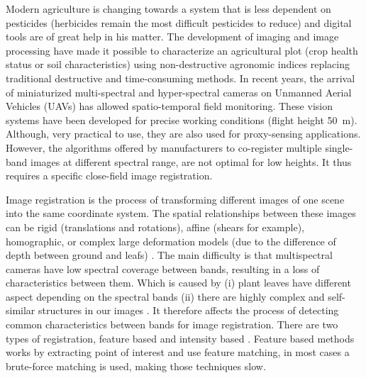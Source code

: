 \documentclass[]{elsarticle}
\begin{document}
	\par Modern agriculture is changing towards a system that is less dependent on pesticides \cite{10.1371/journal.pone.0097922}
	(herbicides remain the most difficult pesticides to reduce) and digital tools are of great help in his matter.
	The development of imaging and image processing have made it possible to characterize an agricultural plot \cite{SANKARAN2015112}
	(crop health status or soil characteristics) using non-destructive agronomic indices \cite{doi:10.1080/02757259509532298, filella1995evaluating, 10.1371/journal.pone.0072736}
	replacing traditional destructive and time-consuming methods.
	In recent years, the arrival of miniaturized multi-spectral and hyper-spectral cameras on Unmanned Aerial Vehicles (UAVs)
	has allowed spatio-temporal field monitoring. These vision systems have been developed for precise working conditions (flight height \SI{50}{\meter}).
	Although, very practical to use, they are also used for proxy-sensing applications.
	However, the algorithms	offered by manufacturers to co-register multiple single-band images at different spectral range,
	are not optimal for low heights. It thus requires a specific close-field image registration.
	\\
	\par Image registration is the process of transforming different images of one scene into the same coordinate system.
	The spatial relationships between these images can be rigid (translations and rotations), affine (shears for example),
	homographic, or complex large deformation models (due to the difference of depth between ground and leafs) \cite{Kamoun}.
	The main difficulty is that multispectral cameras have low spectral coverage between bands, resulting in a loss of characteristics between them.
	Which is caused by (i) plant leaves have different aspect depending on the spectral bands
	(ii) there are highly complex and self-similar structures in our images \cite{douarre:hal-02183837}.
	It therefore affects the process of detecting common characteristics between bands for image registration.
	There are two types of registration, feature based and intensity based \cite{Zitova}.
	Feature based methods works by extracting point of interest and use feature matching, in most cases a brute-force matching is used, making those techniques slow.
\end{document}
